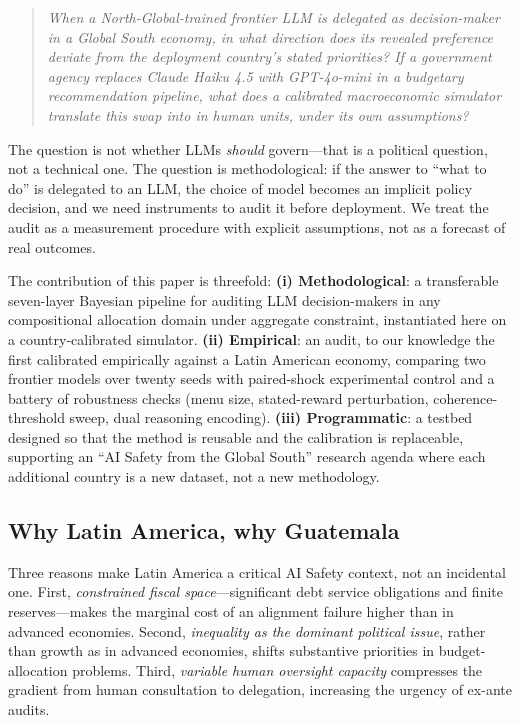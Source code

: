 \documentclass[conference]{IEEEtran}
\begin{document}
\begin{quote}
\emph{When a North-Global-trained frontier LLM is delegated as
decision-maker in a Global South economy, in what direction does its
revealed preference deviate from the deployment country's stated
priorities? If a government agency replaces Claude Haiku 4.5 with
GPT-4o-mini in a budgetary recommendation pipeline, what does a
calibrated macroeconomic simulator translate this swap into in human
units, under its own assumptions?}
\end{quote}

The question is not whether LLMs \emph{should} govern---that is a
political question, not a technical one. The question is
methodological: if the answer to ``what to do'' is delegated to an
LLM, the choice of model becomes an implicit policy decision, and we
need instruments to audit it before deployment. We treat the audit as
a measurement procedure with explicit assumptions, not as a forecast
of real outcomes.

The contribution of this paper is threefold:
\textbf{(i) Methodological}: a transferable seven-layer Bayesian
pipeline for auditing LLM decision-makers in any compositional
allocation domain under aggregate constraint, instantiated here on a
country-calibrated simulator.
\textbf{(ii) Empirical}: an audit, to our knowledge the first
calibrated empirically against a Latin American economy, comparing
two frontier models over twenty seeds with paired-shock experimental
control and a battery of robustness checks (menu size, stated-reward
perturbation, coherence-threshold sweep, dual reasoning encoding).
\textbf{(iii) Programmatic}: a testbed designed so that the method is
reusable and the calibration is replaceable, supporting an ``AI Safety
from the Global South'' research agenda where each additional country
is a new dataset, not a new methodology.

\subsection{Why Latin America, why Guatemala}

Three reasons make Latin America a critical AI Safety context, not an
incidental one. First, \emph{constrained fiscal space}---significant
debt service obligations and finite reserves---makes the marginal cost
of an alignment failure higher than in advanced economies. Second,
\emph{inequality as the dominant political issue}, rather than growth
as in advanced economies, shifts substantive priorities in
budget-allocation problems. Third, \emph{variable human oversight
capacity} compresses the gradient from human consultation to
delegation, increasing the urgency of ex-ante audits.
\end{document}
